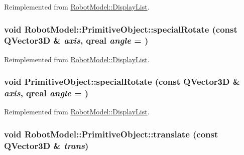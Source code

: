 Reimplemented from \hyperlink{class_robot_model_1_1_display_list_a6c9c1298e237ab25037ad9d7163b118c}{RobotModel::DisplayList}.\hypertarget{class_robot_model_1_1_primitive_object_a33c01b56d7daf2e1d94419f25b9fa902}{
\subsubsection[{specialRotate}]{\setlength{\rightskip}{0pt plus 5cm}void RobotModel::PrimitiveObject::specialRotate (const QVector3D \& {\em axis}, \/  qreal {\em angle} = {})}}
\label{class_robot_model_1_1_primitive_object_a33c01b56d7daf2e1d94419f25b9fa902}


Reimplemented from \hyperlink{class_robot_model_1_1_display_list_abd15964fcf47dbfdcb06d89517871152}{RobotModel::DisplayList}.\hypertarget{class_robot_model_1_1_primitive_object_a07ece283ed8f0f0e3cdf6f36ac7b34dd}{
\subsubsection[{specialRotate}]{\setlength{\rightskip}{0pt plus 5cm}void PrimitiveObject::specialRotate (const QVector3D \& {\em axis}, \/  qreal {\em angle} = {})}}
\label{class_robot_model_1_1_primitive_object_a07ece283ed8f0f0e3cdf6f36ac7b34dd}


Reimplemented from \hyperlink{class_robot_model_1_1_display_list_abd15964fcf47dbfdcb06d89517871152}{RobotModel::DisplayList}.\hypertarget{class_robot_model_1_1_primitive_object_aeddf2c45f6a3d60f2566e58728cc2a96}{
\subsubsection[{translate}]{\setlength{\rightskip}{0pt plus 5cm}void RobotModel::PrimitiveObject::translate (const QVector3D \& {\em trans})}}
\label{class_robot_model_1_1_primitive_object_aeddf2c45f6a3d60f2566e58728cc2a96}


